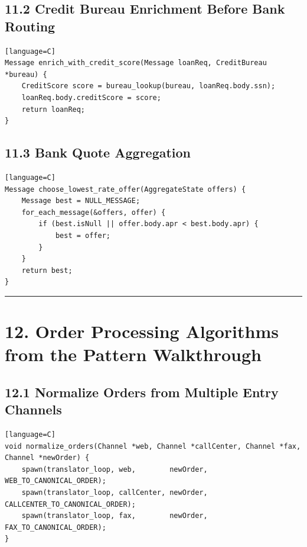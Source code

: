 \documentclass[11pt]{article}
\begin{document}
\subsection{11.2 Credit Bureau Enrichment Before Bank
Routing}\label{credit-bureau-enrichment-before-bank-routing}

\begin{verbatim}[language=C]
Message enrich_with_credit_score(Message loanReq, CreditBureau *bureau) {
    CreditScore score = bureau_lookup(bureau, loanReq.body.ssn);
    loanReq.body.creditScore = score;
    return loanReq;
}
\end{verbatim}

\subsection{11.3 Bank Quote Aggregation}\label{bank-quote-aggregation}

\begin{verbatim}[language=C]
Message choose_lowest_rate_offer(AggregateState offers) {
    Message best = NULL_MESSAGE;
    for_each_message(&offers, offer) {
        if (best.isNull || offer.body.apr < best.body.apr) {
            best = offer;
        }
    }
    return best;
}
\end{verbatim}

\begin{center}\rule{0.5\linewidth}{0.5pt}\end{center}

\section{12. Order Processing Algorithms from the Pattern
Walkthrough}\label{order-processing-algorithms-from-the-pattern-walkthrough}

\subsection{12.1 Normalize Orders from Multiple Entry
Channels}\label{normalize-orders-from-multiple-entry-channels}

\begin{verbatim}[language=C]
void normalize_orders(Channel *web, Channel *callCenter, Channel *fax, Channel *newOrder) {
    spawn(translator_loop, web,        newOrder, WEB_TO_CANONICAL_ORDER);
    spawn(translator_loop, callCenter, newOrder, CALLCENTER_TO_CANONICAL_ORDER);
    spawn(translator_loop, fax,        newOrder, FAX_TO_CANONICAL_ORDER);
}
\end{verbatim}
\end{document}
